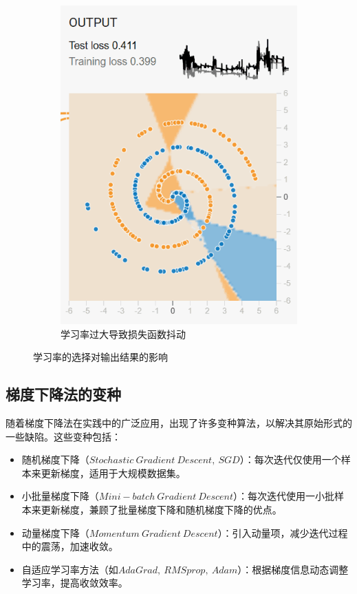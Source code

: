 \documentclass[printMode=true, declarePage=false]{ecnuthesis}
\begin{document}
\begin{figure}[htbp]
\begin{subfigure}[b]{0.3\textwidth}
            \includegraphics[width=\textwidth]{too-fast-1.png}
            \caption{学习率过大导致损失函数抖动}
            \label{fig:another}
        \end{subfigure}
        \caption{学习率的选择对输出结果的影响}
        \label{fig:comparison}
    \end{figure}


    \subsection{梯度下降法的变种}
    随着梯度下降法在实践中的广泛应用，出现了许多变种算法，以解决其原始形式的一些缺陷。这些变种包括：
    \begin{itemize}
        \item 随机梯度下降（$Stochastic\ Gradient\ Descent,\ SGD$）：每次迭代仅使用一个样本来更新梯度，适用于大规模数据集。
        \item 小批量梯度下降（$Mini-batch\ Gradient\ Descent$）：每次迭代使用一小批样本来更新梯度，兼顾了批量梯度下降和随机梯度下降的优点。
        \item 动量梯度下降（$Momentum\ Gradient\ Descent$）：引入动量项，减少迭代过程中的震荡，加速收敛。
        \item 自适应学习率方法（$如AdaGrad,\ RMSprop,\ Adam$）：根据梯度信息动态调整学习率，提高收敛效率。
    \end{itemize}
\end{document}
